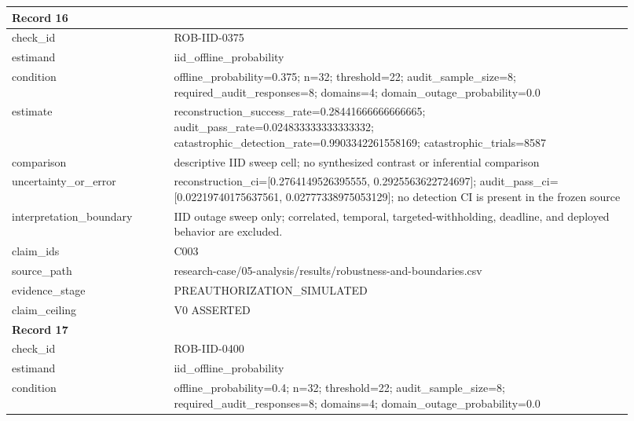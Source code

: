 \begin{longtable}{|p{0.24\linewidth}|p{0.68\linewidth}|}
\multicolumn{2}{|l|}{\textbf{Record 16}} \\ \hline
check\_\allowbreak{}id & ROB-IID-0375 \\ \hline
estimand & iid\_\allowbreak{}offline\_\allowbreak{}probability \\ \hline
condition & offline\_\allowbreak{}probability=0.375;\allowbreak{} n=32;\allowbreak{} threshold=22;\allowbreak{} audit\_\allowbreak{}sample\_\allowbreak{}size=8;\allowbreak{} required\_\allowbreak{}audit\_\allowbreak{}responses=8;\allowbreak{} domains=4;\allowbreak{} domain\_\allowbreak{}outage\_\allowbreak{}probability=0.0 \\ \hline
estimate & reconstruction\_\allowbreak{}success\_\allowbreak{}rate=0.28441666666666665;\allowbreak{} audit\_\allowbreak{}pass\_\allowbreak{}rate=0.024833333333333332;\allowbreak{} catastrophic\_\allowbreak{}detection\_\allowbreak{}rate=0.9903342261558169;\allowbreak{} catastrophic\_\allowbreak{}trials=8587 \\ \hline
comparison & descriptive IID sweep cell;\allowbreak{} no synthesized contrast or inferential comparison \\ \hline
uncertainty\_\allowbreak{}or\_\allowbreak{}error & reconstruction\_\allowbreak{}ci=[0.2764149526395555, 0.2925563622724697];\allowbreak{} audit\_\allowbreak{}pass\_\allowbreak{}ci=[0.02219740175637561, 0.02777338975053129];\allowbreak{} no detection CI is present in the frozen source \\ \hline
interpretation\_\allowbreak{}boundary & IID outage sweep only;\allowbreak{} correlated, temporal, targeted-withholding, deadline, and deployed behavior are excluded. \\ \hline
claim\_\allowbreak{}ids & C003 \\ \hline
source\_\allowbreak{}path & research-case/05-analysis/results/robustness-and-boundaries.csv \\ \hline
evidence\_\allowbreak{}stage & PREAUTHORIZATION\_\allowbreak{}SIMULATED \\ \hline
claim\_\allowbreak{}ceiling & V0 ASSERTED \\ \hline
\multicolumn{2}{|l|}{\textbf{Record 17}} \\ \hline
check\_\allowbreak{}id & ROB-IID-0400 \\ \hline
estimand & iid\_\allowbreak{}offline\_\allowbreak{}probability \\ \hline
condition & offline\_\allowbreak{}probability=0.4;\allowbreak{} n=32;\allowbreak{} threshold=22;\allowbreak{} audit\_\allowbreak{}sample\_\allowbreak{}size=8;\allowbreak{} required\_\allowbreak{}audit\_\allowbreak{}responses=8;\allowbreak{} domains=4;\allowbreak{} domain\_\allowbreak{}outage\_\allowbreak{}probability=0.0 \\ \hline

\end{longtable}
